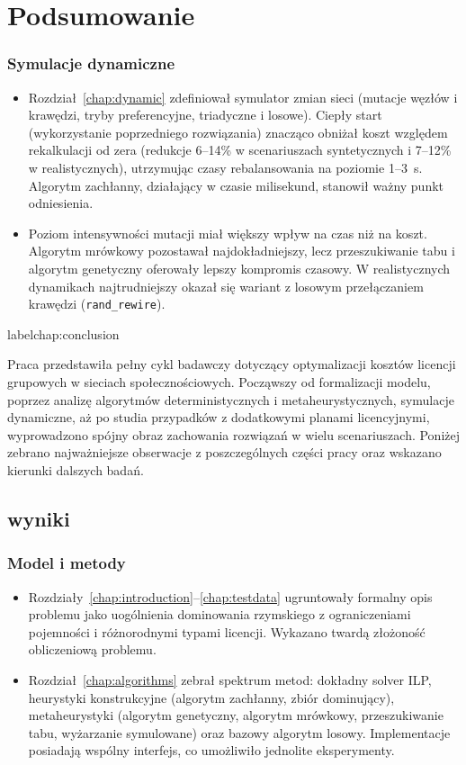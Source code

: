 \chapter{Podsumowanie}
\subsection*{Symulacje dynamiczne}
\begin{itemize}
  \item Rozdział~\ref{chap:dynamic} zdefiniował symulator zmian sieci (mutacje węzłów i krawędzi, tryby preferencyjne, triadyczne i losowe). Ciepły start (wykorzystanie poprzedniego rozwiązania) znacząco obniżał koszt względem rekalkulacji od zera (redukcje 6--14\% w scenariuszach syntetycznych i 7--12\% w realistycznych), utrzymując czasy rebalansowania na poziomie 1--3~s. Algorytm zachłanny, działający w czasie milisekund, stanowił ważny punkt odniesienia.
  \item Poziom intensywności mutacji miał większy wpływ na czas niż na koszt. Algorytm mrówkowy pozostawał najdokładniejszy, lecz przeszukiwanie tabu i algorytm genetyczny oferowały lepszy kompromis czasowy. W realistycznych dynamikach najtrudniejszy okazał się wariant z losowym przełączaniem krawędzi (\texttt{rand\_rewire}).
\end{itemize}label{chap:conclusion}

Praca przedstawiła pełny cykl badawczy dotyczący optymalizacji kosztów licencji grupowych w sieciach społecznościowych. Począwszy od formalizacji modelu, poprzez analizę algorytmów deterministycznych i metaheurystycznych, symulacje dynamiczne, aż po studia przypadków z dodatkowymi planami licencyjnymi, wyprowadzono spójny obraz zachowania rozwiązań w wielu scenariuszach. Poniżej zebrano najważniejsze obserwacje z poszczególnych części pracy oraz wskazano kierunki dalszych badań.

\section{wyniki}

\subsection*{Model i metody}
\begin{itemize}
  \item Rozdziały~\ref{chap:introduction}--\ref{chap:testdata} ugruntowały formalny opis problemu jako uogólnienia dominowania rzymskiego z ograniczeniami pojemności i różnorodnymi typami licencji. Wykazano twardą złożoność obliczeniową problemu.
  \item Rozdział~\ref{chap:algorithms} zebrał spektrum metod: dokładny solver ILP, heurystyki konstrukcyjne (algorytm zachłanny, zbiór dominujący), metaheurystyki (algorytm genetyczny, algorytm mrówkowy, przeszukiwanie tabu, wyżarzanie symulowane) oraz bazowy algorytm losowy. Implementacje posiadają wspólny interfejs, co umożliwiło jednolite eksperymenty.
\end{itemize}

